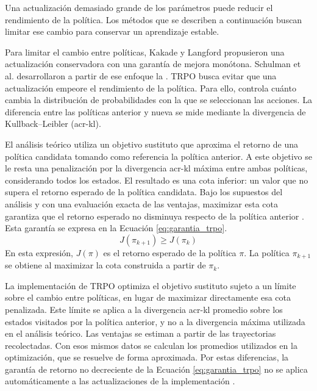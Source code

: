 Una actualización demasiado grande de los parámetros puede reducir el rendimiento de la política. Los métodos que se describen a continuación buscan limitar ese cambio para conservar un aprendizaje estable.

Para limitar el cambio entre políticas, Kakade y Langford \cite{kakade2002approximately} propusieron una actualización conservadora con una garantía de mejora monótona. Schulman et al. \cite{schulman2015trust} desarrollaron a partir de ese enfoque la . TRPO busca evitar que una actualización empeore el rendimiento de la política. Para ello, controla cuánto cambia la distribución de probabilidades con la que se seleccionan las acciones. La diferencia entre las políticas anterior y nueva se mide mediante la divergencia de Kullback--Leibler (\acrshort{acr-kl}).

El análisis teórico utiliza un objetivo sustituto que aproxima el retorno de una política candidata tomando como referencia la política anterior. A este objetivo se le resta una penalización por la divergencia \acrshort{acr-kl} máxima entre ambas políticas, considerando todos los estados. El resultado es una cota inferior: un valor que no supera el retorno esperado de la política candidata. Bajo los supuestos del análisis y con una evaluación exacta de las ventajas, maximizar esta cota garantiza que el retorno esperado no disminuya respecto de la política anterior \cite{schulman2015trust}. Esta garantía se expresa en la Ecuación \eqref{eq:garantia_trpo}.
\begin{equation}
    J(\pi_{k+1}) \ge J(\pi_k)
    \label{eq:garantia_trpo}
\end{equation}
En esta expresión, $J(\pi)$ es el retorno esperado de la política $\pi$. La política $\pi_{k+1}$ se obtiene al maximizar la cota construida a partir de $\pi_k$.

La implementación de TRPO optimiza el objetivo sustituto sujeto a un límite sobre el cambio entre políticas, en lugar de maximizar directamente esa cota penalizada. Este límite se aplica a la divergencia \acrshort{acr-kl} promedio sobre los estados visitados por la política anterior, y no a la divergencia máxima utilizada en el análisis teórico. Las ventajas se estiman a partir de las trayectorias recolectadas. Con esos mismos datos se calculan los promedios utilizados en la optimización, que se resuelve de forma aproximada. Por estas diferencias, la garantía de retorno no decreciente de la Ecuación \eqref{eq:garantia_trpo} no se aplica automáticamente a las actualizaciones de la implementación \cite{schulman2015trust}.

